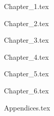 \documentclass[a4paper,oneside]{book}
\begin{document}
 {Chapter_1.tex}

 {Chapter_2.tex}

 {Chapter_3.tex}

 {Chapter_4.tex}

 {Chapter_5.tex}

 {Chapter_6.tex}

%

 {Appendices.tex}
\end{document}
